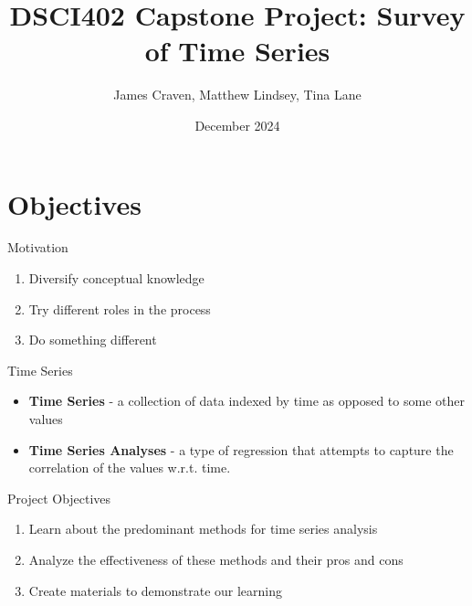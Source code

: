 \documentclass[9pt, dvipsnames]{beamer}
\title[DSCI402 Capstone Project]{DSCI402 Capstone Project: Survey of Time Series}
\author{James Craven, Matthew Lindsey, Tina Lane}
\date{December 2024}
\begin{document}
\maketitle

\section{Objectives}
    \begin{frame}{Motivation}
        \begin{enumerate}
            \item Diversify conceptual knowledge \pause
            \item Try different roles in the process \pause
            \item Do something different
        \end{enumerate}
    \end{frame}
    \begin{frame}{Time Series}
        \begin{itemize}
            \item \textbf{Time Series} - a collection of data indexed by time
                as opposed to some other values \pause
            \item \textbf{Time Series Analyses} - a type of regression that attempts
                to capture the correlation of the values w.r.t. time.
        \end{itemize}
    \end{frame}
    \begin{frame}{Project Objectives}
        \begin{enumerate}
            \item Learn about the predominant methods for time series analysis \pause
            \item Analyze the effectiveness of these methods and their pros and
                cons \pause
            \item Create materials to demonstrate our learning
        \end{enumerate}
    \end{frame}
\end{document}
